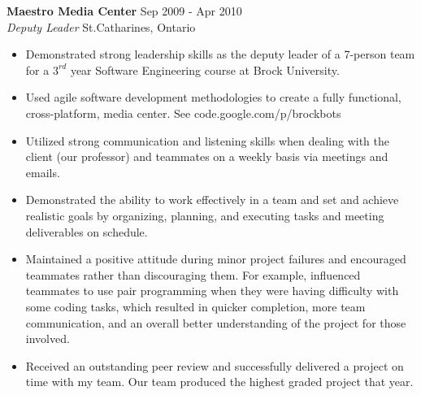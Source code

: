 \documentclass[margin]{res}
\begin{document}
\begin{resume}
	\textbf{Maestro Media Center} \hfill Sep 2009 - Apr 2010 \\
    {\sl Deputy Leader} \hfill St.\hspace{2 pt}Catharines, Ontario
	\begin{itemize}  \itemsep -2pt %
	  \item Demonstrated strong leadership skills as the deputy leader of a 7-person team for a $3^{rd}$
	  year Software Engineering course at Brock University.
	  \item Used agile software development methodologies to create a fully functional, cross-platform,
	  media center. See code.google.com/p/brockbots
	  \item Utilized strong communication and listening skills when dealing with the client
	  (our professor) and teammates on a weekly basis via meetings and emails.
	  \item Demonstrated the ability to work effectively in a team and set and achieve realistic
	  goals by organizing, planning, and executing tasks and meeting deliverables on schedule.
	  \item Maintained a positive attitude during minor project failures and encouraged teammates
	  rather than discouraging them. For example, influenced teammates to use pair programming
	  when they were having difficulty with some coding tasks, which resulted in quicker
	  completion, more team communication, and an overall better understanding of the project for
	  those involved.
	  \item Received an outstanding peer review and successfully delivered a project on time with my team.
	  Our team produced the highest graded project that year.
	\end{itemize}


\end{resume}
\end{document}
